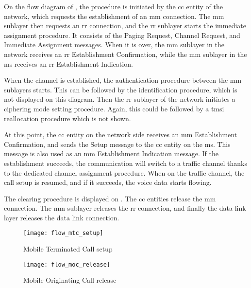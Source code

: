     On the flow diagram of , the procedure is
    initiated by the \gls{cc} entity of the network, which requests the
    establishment of an \gls{mm} connection. The \gls{mm} sublayer then
    requests an \gls{rr} connection, and the \gls{rr} sublayer starts
    the immediate assignment procedure. It consists of the Paging
    Request, Channel Request, and Immediate Assignment messages. When it
    is over, the \gls{mm} sublayer in the network receives an \gls{rr}
    Establishment Confirmation, while the \gls{mm} sublayer in the
    \gls{ms} receives an \gls{rr} Establishment Indication.

    When the channel is established, the authentication procedure
    between the \gls{mm} sublayers starts. This can be followed by the
    identification procedure, which is not displayed on this diagram.
    Then the \gls{rr} sublayer of the network initiates a ciphering mode
    setting procedure. Again, this could be followed by a \gls{tmsi}
    reallocation procedure which is not shown.
    
    At this point, the \gls{cc} entity on the network side receives an
    \gls{mm} Establishment Confirmation, and sends the Setup message to
    the \gls{cc} entity on the \gls{ms}. This message is also used as an
    \gls{mm} Establishment Indication message. If the establishment
    succeeds, the communication will switch to a traffic channel thanks
    to the dedicated channel assignment procedure. When on the traffic
    channel, the call setup is resumed, and if it succeeds, the voice
    data starts flowing.

    The clearing procedure is displayed on .
    The \gls{cc} entities release the \gls{mm} connection. The \gls{mm}
    sublayer releases the \gls{rr} connection, and finally the data link
    layer releases the data link connection.

      \begin{figure}
        \centering
        \texttt{[image: flow\_mtc\_setup]}
        \caption{Mobile Terminated Call
        setup~\cite[p.~115]{3gpp_ts_2014-6}}
        \label{fig:flow_mtc_setup}
      \end{figure}

      \begin{figure}
        \centering
        \texttt{[image: flow\_moc\_release]}
        \caption{Mobile Originating Call
        release~\cite[p.~116]{3gpp_ts_2014-6}}
        \label{fig:flow_moc_release}
      \end{figure}

